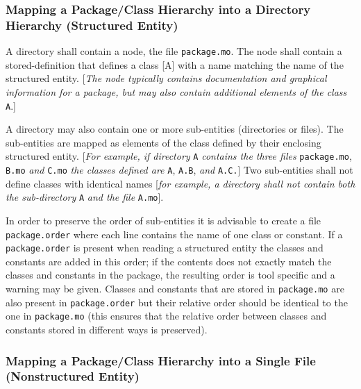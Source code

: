 \subsubsection{Mapping a Package/Class Hierarchy into a Directory Hierarchy (Structured Entity)}

A directory shall contain a node, the file \lstinline!package.mo!. The node shall contain a stored-definition that defines a class {[}A{]} with a name
matching the name of the structured entity. {[}\emph{The node typically
contains documentation and graphical information for a package, but may
also contain additional elements of the class} \lstinline!A!.{]}

A directory may also contain one or more sub-entities (directories or
files). The sub-entities are mapped as elements of the class defined by
their enclosing structured entity. {[}\emph{For example, if directory} \lstinline!A!
\emph{contains the three files} \lstinline!package.mo!, \lstinline!B.mo! \emph{and} 
\lstinline!C.mo!
\emph{the classes defined are} \lstinline!A!, \lstinline!A.B!, \emph{and} \lstinline!A.C.!{]} Two
sub-entities shall not define classes with identical names {[}\emph{for
example, a directory shall not contain both the sub-directory} \lstinline!A!
\emph{and the file} \lstinline!A.mo!{]}.

In order to preserve the order of sub-entities it is advisable to create
a file \lstinline!package.order! where each line contains the name of one class or
constant. If a \lstinline!package.order! is present when reading a structured entity
the classes and constants are added in this order; if the contents does
not exactly match the classes and constants in the package, the
resulting order is tool specific and a warning may be given. Classes and
constants that are stored in \lstinline!package.mo! are also present in
\lstinline!package.order! but their relative order should be identical to the one in
\lstinline!package.mo! (this ensures that the relative order between classes and
constants stored in different ways is preserved).

\subsubsection{Mapping a Package/Class Hierarchy into a Single File (Nonstructured Entity)}

